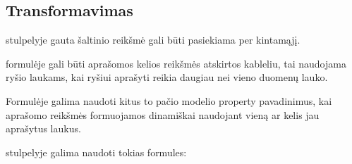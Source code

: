 \documentclass[letterpaper,10pt,lithuanian]{sphinxmanual}
\begin{document}
\subsection{Transformavimas}
\label{\detokenize{formules:transformavimas}}
\sphinxAtStartPar
{\hyperref[\detokenize{dimensijos:property.prepare}]{}} stulpelyje gauta šaltinio reikšmė gali būti pasiekiama
per  kintamąjį.

\sphinxAtStartPar
{\hyperref[\detokenize{dimensijos:property.prepare}]{}} formulėje gali būti aprašomos kelios reikšmės atskirtos
kableliu, tai naudojama ryšio laukams, kai ryšiui aprašyti reikia daugiau nei
vieno duomenų lauko.

\sphinxAtStartPar
Formulėje galima naudoti kitus to pačio modelio property pavadinimus, kai
aprašomo {\hyperref[\detokenize{formatas:property}]{}} reikšmės formuojamos dinamiškai naudojant vieną ar
kelis jau aprašytus laukus.

\sphinxAtStartPar
{\hyperref[\detokenize{dimensijos:property.prepare}]{}} stulpelyje galima naudoti tokias formules:
\end{document}
